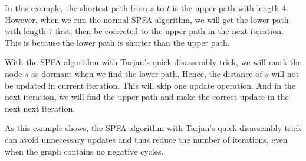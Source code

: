 \documentclass[a4paper,12pt]{article}
\begin{document}
In this example, the shortest path from $s$ to $t$ is the upper path with length 4.
However, when we run the normal SPFA algorithm, we will get the lower path with length 7 first, then be corrected to the upper path in the next iteration.
This is because the lower path is shorter than the upper path.

With the SPFA algorithm with Tarjan's quick disassembly trick, we will mark the node $s$ as dormant when we find the lower path.
Hence, the distance of $s$ will not be updated in current iteration.
This will skip one update operation.
And in the next iteration, we will find the upper path and make the correct update in the next next iteration.

As this example shows, the SPFA algorithm with Tarjan's quick disassembly trick can avoid unnecessary updates and thus reduce the number of iterations, even when the graph contains no negative cycles.



\end{document}
